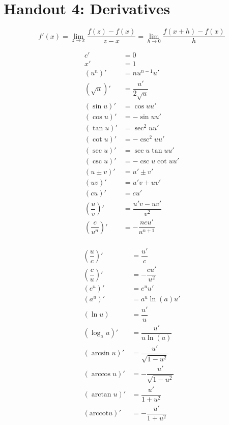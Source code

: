\section{Handout 4: Derivatives}

\[
    f'(x) = \lim_{z \to x} \dfrac{f(z) - f(x)}{z-x} = \lim_{h \to 0} \dfrac{f(x+h) - f(x)}{h}
\]

\begin{multicols}{2}
    \begin{align*}
        c' &= 0 \\
        x' &= 1 \\
        (u^n)' &= nu^{n-1}u' \\
        (\sqrt{u})' &= \dfrac{u'}{2\sqrt{u}} \\
        (\sin{u})' &= \cos{u}u' \\
        (\cos{u})' &= -\sin{u}u' \\
        (\tan{u})' &= \sec^2{u}u' \\
        (\cot{u})' &= -\csc^2{u}u' \\
        (\sec{u})' &= \sec{u}\tan{u}u' \\
        (\csc{u})' &= -\csc{u}\cot{u}u' \\
        (u\pm v)' &= u' \pm v' \\
        (uv)' &= u'v + uv' \\  
        (cu)' &= cu' \\
        \left(\dfrac{u}{v}\right)' &= \dfrac{u'v - uv'}{v^2} \\
        \left(\dfrac{c}{u^n}\right)' &= -\dfrac{ncu'}{u^{n+1}} \\
    \end{align*}
    \vfill\null
    \columnbreak

    \begin{align*}
        (\dfrac{u}{c})' &= \dfrac{u'}{c} \\
        (\dfrac{c}{u})' &= -\dfrac{cu'}{u^2} \\
        (e^u)' &= e^u u' \\
        (a^u)' &= a^u \ln(a)u' \\
        (\ln{u}) &= \dfrac{u'}{u} \\
        (\log_a{u})' &= \dfrac{u'}{u\ln(a)} \\
        (\arcsin{u})' &= \dfrac{u'}{\sqrt{1-u^2}} \\
        (\arccos{u})' &= -\dfrac{u'}{\sqrt{1-u^2}} \\
        (\arctan{u})' &= \dfrac{u'}{1+u^2} \\
        (\text{arccot}{u})' &= -\dfrac{u'}{1+u^2} \\
    \end{align*}
\end{multicols}
\pagebreak
